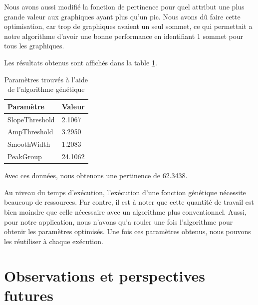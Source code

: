 \documentclass[12pt,letterpaper]{article}
\begin{document}
Nous avons aussi modifié la fonction de pertinence pour quel attribut une plus grande valeur aux graphiques ayant plus qu’un pic. 
Nous avons dû faire cette optimisation, car trop de graphiques avaient un seul sommet, ce qui permettait a notre algorithme d'avoir une bonne
performance en identifiant 1 sommet pour tous les graphiques.

Les résultats obtenus sont affichés dans la table \ref{tab:genparam}.

\begin{table}[h]
  \begin{center}
    \begin{tabular} {|l|l|}
        \hline
        \bf{Paramètre} & \bf{Valeur} \\
        \hline
        SlopeThreshold & 2.1067 \\
        \hline
        AmpThreshold & 3.2950 \\
        \hline
        SmoothWidth & 1.2083 \\
        \hline
        PeakGroup & 24.1062 \\
        \hline
    \end{tabular}
    \caption{Paramètres trouvés à l'aide de l'algorithme génétique}
    \label{tab:genparam}
  \end{center}
\end{table}

Avec ces données, nous obtenons une pertinence de 62.3438.

Au niveau du temps d'exécution, l'exécution d'une fonction génétique nécessite beaucoup de ressources. Par contre, il est à noter que 
cette quantité de travail est bien moindre que celle nécessaire avec un algorithme plus conventionnel. Aussi, pour notre application, nous n'avons
qu'a rouler une fois l'algorithme pour obtenir les paramètres optimisés. Une fois ces paramètres obtenus, nous pouvons les réutiliser à chaque exécution.

\section{Observations et perspectives futures}
\end{document}
